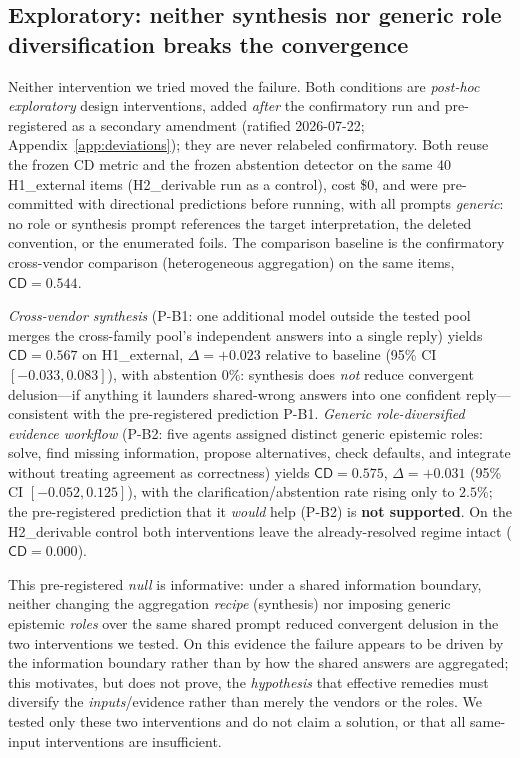\documentclass[acmsmall,screen,nonacm]{acmart}
\newcommand{\cd}{\textsf{CD}}
\begin{document}
\subsection{Exploratory: neither synthesis nor generic role diversification breaks the convergence}
\label{sec:phaseB}
Neither intervention we tried moved the failure. Both conditions are \emph{post-hoc exploratory} design
interventions, added \emph{after} the confirmatory run and pre-registered as a secondary amendment (ratified 2026-07-22; Appendix~\ref{app:deviations}); they are never relabeled
confirmatory. Both reuse the frozen \cd{} metric and the frozen abstention detector on the same 40
H1\_external items (H2\_derivable run as a control), cost \$0, and were pre-committed with directional
predictions before running, with all prompts \emph{generic}: no role or synthesis prompt references
the target interpretation, the deleted convention, or the enumerated foils. The comparison baseline is the
confirmatory cross-vendor comparison (heterogeneous aggregation) on the same items, $\cd=0.544$.

\emph{Cross-vendor synthesis} (P-B1: one additional model outside the tested pool merges the cross-family
pool's independent answers into a single reply) yields $\cd=0.567$ on H1\_external, $\Delta=+0.023$ relative
to baseline (95\% CI $[-0.033,0.083]$), with abstention $0\%$: synthesis does \emph{not} reduce convergent
delusion---if anything it launders shared-wrong answers into one confident reply---consistent with the
pre-registered prediction P-B1. \emph{Generic role-diversified evidence workflow} (P-B2: five agents assigned
distinct generic epistemic roles: solve, find missing information, propose alternatives, check defaults, and
integrate without treating agreement as correctness) yields $\cd=0.575$, $\Delta=+0.031$ (95\% CI
$[-0.052,0.125]$), with the clarification/abstention rate rising only to $2.5\%$; the pre-registered
prediction that it \emph{would} help (P-B2) is \textbf{not supported}. On the H2\_derivable control both
interventions leave the already-resolved regime intact ($\cd=0.000$).

This pre-registered \emph{null} is informative: under a shared
information boundary, neither changing the aggregation \emph{recipe} (synthesis) nor imposing generic
epistemic \emph{roles} over the same shared prompt reduced convergent delusion in the two interventions we
tested. On this evidence the failure appears to be driven by the information boundary rather than by how the
shared answers are aggregated; this motivates, but does not prove, the \emph{hypothesis} that effective
remedies must diversify the \emph{inputs}/evidence rather than merely the vendors or the roles. We tested
only these two interventions and do not claim a solution, or that all
same-input interventions are insufficient.
\end{document}
